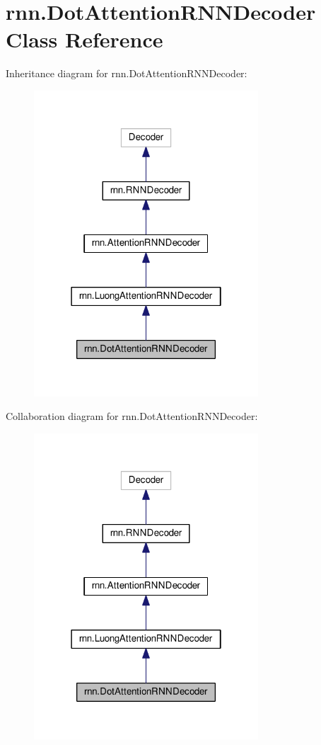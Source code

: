 \hypertarget{classrnn_1_1DotAttentionRNNDecoder}{}\section{rnn.\+Dot\+Attention\+R\+N\+N\+Decoder Class Reference}
\label{classrnn_1_1DotAttentionRNNDecoder}


Inheritance diagram for rnn.\+Dot\+Attention\+R\+N\+N\+Decoder\+:
\nopagebreak
\begin{figure}[H]
\begin{center}
\leavevmode
\includegraphics[width=238pt]{classrnn_1_1DotAttentionRNNDecoder__inherit__graph}
\end{center}
\end{figure}


Collaboration diagram for rnn.\+Dot\+Attention\+R\+N\+N\+Decoder\+:
\nopagebreak
\begin{figure}[H]
\begin{center}
\leavevmode
\includegraphics[width=238pt]{classrnn_1_1DotAttentionRNNDecoder__coll__graph}
\end{center}
\end{figure}
